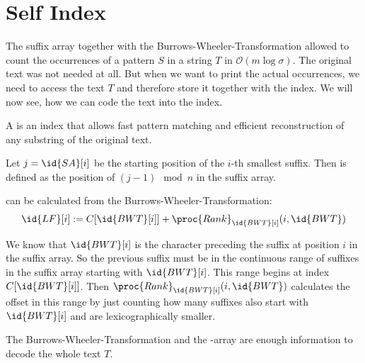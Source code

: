 \section{Self Index}

The suffix array together with the Burrows-Wheeler-Transformation allowed to count the occurrences of a pattern $S$ in a string $T$ in $\mathcal{O}(m\log\sigma)$. The original text was not needed at all. But when we want to print the actual occurrences, we need to access the text $T$ and therefore store it together with the index. We will now see, how we can code the text into the index.

\begin{Definition}
  A  is an index that allows fast pattern matching and efficient reconstruction of any substring of the original text.
\end{Definition}

\begin{Definition}
  Let $j = \id{SA}[i]$ be the starting position of the $i$-th smallest suffix. Then  is defined as the position of $(j-1) \mod n$ in the suffix array.
\end{Definition}

\begin{Theorem}
   can be calculated from the Burrows-Wheeler-Transformation:
  \begin{align}
    \id{LF}[i] := C[\id{BWT}[i]] + \proc{Rank}_{\id{BWT}[i]}(i, \id{BWT})
    \label{eq:lfMapping}
  \end{align}
\end{Theorem}

\begin{Proof}
  We know that $\id{BWT}[i]$ is the character preceding the suffix at position $i$ in the suffix array. So the previous suffix must be in the continuous range of suffixes in the suffix array starting with $\id{BWT}[i]$. This range begins at index $C[\id{BWT}[i]]$. Then $\proc{Rank}_{\id{BWT}[i]}(i, \id{BWT})$ calculates the offset in this range by just counting how many suffixes also start with $\id{BWT}[i]$ and are lexicographically smaller.
\end{Proof}

\begin{Theorem}
  \label{thm:lfMapping}
  The Burrows-Wheeler-Transformation and the -array are enough information to decode the whole text $T$.
\end{Theorem}

